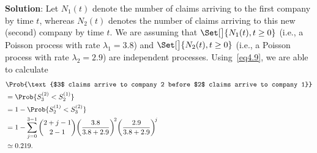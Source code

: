 \begin{Example}
\begin{enumerate}[(a)]
              \textbf{Solution}: Let $ N_1(t) $ denote the number of claims arriving to the first company
              by time $ t $, whereas $ N_2(t) $ denotes the number of claims arriving
              to this new (second) company by time $ t $. We are assuming that
              $ \Set[\big]{N_1(t),t\ge 0} $ (i.e., a Poisson process with rate $ \lambda_1=3.8 $)
              and $ \Set[\big]{N_2(t),t\ge 0} $ (i.e., a Poisson process with rate $ \lambda_2=2.9 $)
              are independent processes. Using~\ref{eq4.9}, we are able to
              calculate
              \begin{align*}
                   & \Prob{\text{$3$ claims arrive to company 2 before $2$ claims arrive to company 1}}                                  \\
                   & =\Prob{S_3^{(2)}<S_2^{(1)}}                                                                                         \\
                   & =1-\Prob{S_2^{(1)}<S_3^{(2)}}                                                                                       \\
                   & =1-\sum_{j=0}^{3-1}\binom{2+j-1}{2-1}\biggl(\frac{3.8}{3.8+2.9}\biggr)^{\!2}\biggl(\frac{2.9}{3.8+2.9}\biggr)^{\!j} \\
                   & \simeq 0.219.
              \end{align*}
    \end{enumerate}
\end{Example}
